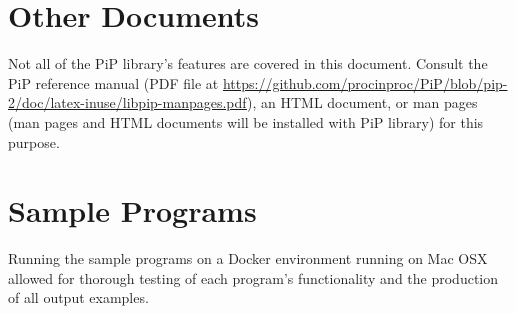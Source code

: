 \section*{Other Documents}

Not all of the PiP library's features are covered in this
document. Consult the PiP reference manual (PDF file at
\url{https://github.com/procinproc/PiP/blob/pip-2/doc/latex-inuse/libpip-manpages.pdf}), 
an HTML document, or man pages (man pages and HTML documents will be
installed with PiP library) for this purpose.

\section*{Sample Programs}

Running the sample programs on a Docker environment running on Mac OSX
allowed for thorough testing of each program's functionality and the
production of all output examples. 

